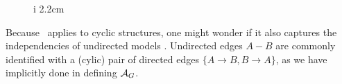 \begin{wrapfigure}[4]{i}
        {2.2cm}
    \centering
\end{wrapfigure}
Because \scibility\ applies to cyclic structures,  one might wonder if
    it also captures the independencies of undirected models 
    \unskip.
Undirected edges $A {-} B$ are commonly identified
with a (cylic) pair of directed edges $\{ A{\to}B, B{\to}A\}$,
as we have implicitly done in
defining $\mathcal A_G$. 
